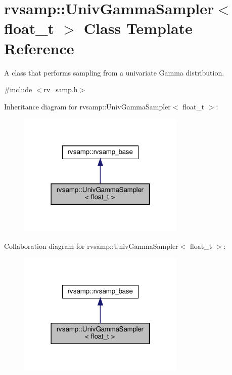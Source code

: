 \hypertarget{classrvsamp_1_1UnivGammaSampler}{}\section{rvsamp\+:\+:Univ\+Gamma\+Sampler$<$ float\+\_\+t $>$ Class Template Reference}
\label{classrvsamp_1_1UnivGammaSampler}


A class that performs sampling from a univariate Gamma distribution.  




{\ttfamily \#include $<$rv\+\_\+samp.\+h$>$}



Inheritance diagram for rvsamp\+:\+:Univ\+Gamma\+Sampler$<$ float\+\_\+t $>$\+:\nopagebreak
\begin{figure}[H]
\begin{center}
\leavevmode
\includegraphics[width=226pt]{classrvsamp_1_1UnivGammaSampler__inherit__graph}
\end{center}
\end{figure}


Collaboration diagram for rvsamp\+:\+:Univ\+Gamma\+Sampler$<$ float\+\_\+t $>$\+:\nopagebreak
\begin{figure}[H]
\begin{center}
\leavevmode
\includegraphics[width=226pt]{classrvsamp_1_1UnivGammaSampler__coll__graph}
\end{center}
\end{figure}
